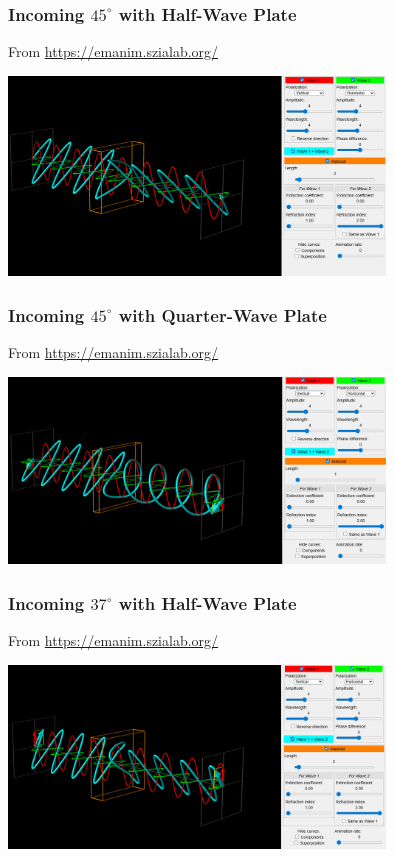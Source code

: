 \documentclass{beamer}
\begin{document}
\begin{frame}\frametitle{Incoming $45^\circ$ with Half-Wave Plate}
From \url{https://emanim.szialab.org/}

\begin{center}
\includegraphics[width=10cm]{fig/waveplate_45_2.png}
\end{center}
\end{frame}

\begin{frame}\frametitle{Incoming $45^\circ$ with Quarter-Wave Plate}
From \url{https://emanim.szialab.org/}

\begin{center}
\includegraphics[width=10cm]{fig/waveplate_45_4.png}
\end{center}
\end{frame}

\begin{frame}\frametitle{Incoming $37^\circ$ with Half-Wave Plate}
From \url{https://emanim.szialab.org/}

\begin{center}
\includegraphics[width=10cm]{fig/waveplate_37_2.png}
\end{center}
\end{frame}
\end{document}
